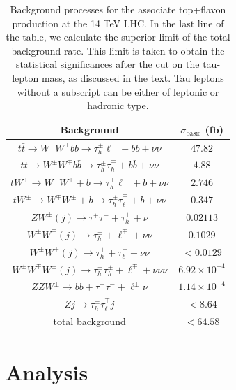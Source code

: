 \documentclass[prd,amsfonts,onecolumn,superscriptaddress,aps,nofootinbib,11pt]{revtex4-1}
\begin{document}
\begin{table}[h!]

\begin{tabular}{c c}
\hline
 Background & $\sigma_{\text{basic}}$ (fb) \\ \hline\hline 
 $t\bar{t}\to W^\pm W^\mp b\bar{b}\to \tau_{h}^\pm \ell^\mp + b\bar{b}+\nu\nu$ & $47.82$\\ 
 
 $t\bar{t}\to W^\pm W^\mp b\bar{b}\to \tau_{h}^\pm \tau_{h}^\mp + b\bar{b}+\nu\nu$ & $4.88$ \\ 
 \hline

 $tW^\pm \to W^\mp W^\pm+b\to \tau_{h}^\pm \ell^\mp + b+ \nu\nu$ & $2.746$       \\ 
 $tW^\pm \to W^\mp W^\pm+b\to \tau_h^\pm \tau_{\ell}^\mp + b+ \nu\nu$ & $0.347$ \\ \hline
 
 $ZW^\pm(j)  \to \tau^+\tau^- + \tau_{h}^\pm + \nu$ & $0.02113$ \\ 

 $W^\pm W^\mp(j) \to \tau_h^\pm + \ell^\mp + \nu\nu$ & $0.1029$ \\ 
 
 $W^\pm W^\mp(j) \to \tau_h^\pm + \tau_{\ell}^\mp + \nu\nu$ & $<0.0129$ \\ 
 \hline

 $W^\pm W^\mp W^\pm(j)  \to \tau_h^\pm\tau_h^\pm + \ell^\mp + \nu\nu\nu$ & $6.92\times 10^{-4}$  \\ 
 
 $Z Z W^\pm \to b \bar{b} + \tau^+ \tau^- + \ell^{\pm} \nu$ & $1.14 \times 10^{-4}$ \\ 
 \hline

 $Z j \to \tau_h^{\pm}\tau_{\ell}^{\mp}j$ & $<8.64$ \\ 
 \hline
 total background & $<64.58$ \\
 \hline
\end{tabular}
\caption{Background processes for the associate top+flavon production at the 14 TeV LHC. In the last line of the table, we calculate the superior limit of the total background rate. This limit is taken to obtain the statistical significances after the cut on the tau-lepton mass, as discussed in the text. Tau leptons without a subscript can be either of leptonic or hadronic type.}
\label{tab:simple}
\end{table}


\section{Analysis}\label{sec:analysis}
\end{document}
